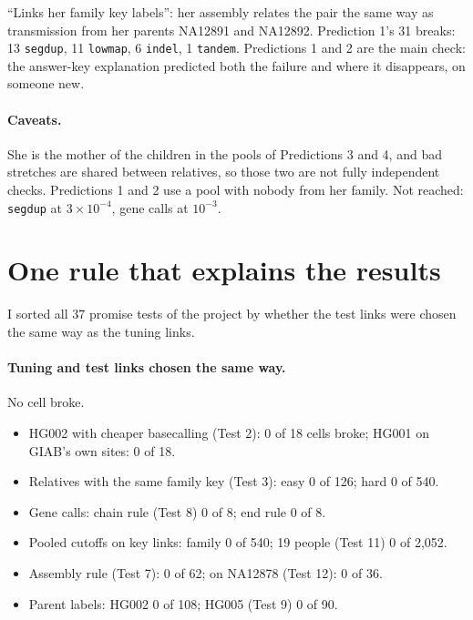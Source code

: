 \documentclass[11pt]{article}
\newcommand{\grp}[1]{\texttt{#1}}
\begin{document}
\enquote{Links her family key labels}: her assembly relates the pair the same way
as transmission from her parents NA12891 and NA12892. Prediction 1's 31
breaks: 13 \grp{segdup}, 11 \grp{lowmap}, 6 \grp{indel}, 1 \grp{tandem}.
Predictions 1 and 2 are the main check: the answer-key explanation
predicted both the failure and where it disappears, on someone new.

\paragraph{Caveats.} She is the mother of the children in the pools of
Predictions 3 and 4, and bad stretches are shared between relatives, so those
two are not fully independent checks. Predictions 1 and 2 use a
pool with nobody from her family. Not reached: \grp{segdup} at
$3\times10^{-4}$, gene calls at $10^{-3}$.

\section{One rule that explains the results}\label{sec:rule}

\begin{center}
\end{center}

I sorted all 37 promise tests of the project by whether the test links
were chosen the same way as the tuning links.

\paragraph{Tuning and test links chosen the same way.} No cell broke.
\begin{itemize}
\item HG002 with cheaper basecalling (Test 2): 0 of 18 cells broke; HG001 on
  GIAB's own sites: 0 of 18.
\item Relatives with the same family key (Test 3): easy 0 of 126; hard 0 of
  540.
\item Gene calls: chain rule (Test 8) 0 of 8; end rule 0 of 8.
\item Pooled cutoffs on key links: family 0 of 540; 19 people (Test 11) 0 of
  2{,}052.
\item Assembly rule (Test 7): 0 of 62; on NA12878 (Test 12): 0 of 36.
\item Parent labels: HG002 0 of 108; HG005 (Test 9) 0 of 90.
\end{itemize}
\end{document}
